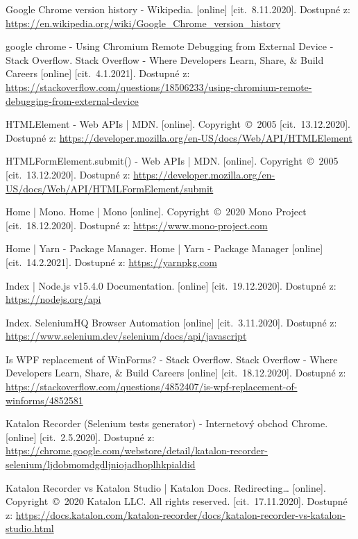 \begin{thebibliography}{99}
 Google Chrome version history - Wikipedia. [online] [cit.~8.11.2020]. Dostupné z: \url{https://en.wikipedia.org/wiki/Google_Chrome_version_history}

 google chrome - Using Chromium Remote Debugging from External Device - Stack Overflow. Stack Overflow - Where Developers Learn, Share, \& Build Careers [online] [cit.~4.1.2021]. Dostupné z: \url{https://stackoverflow.com/questions/18506233/using-chromium-remote-debugging-from-external-device}

 HTMLElement - Web APIs | MDN. [online]. Copyright~©~2005 [cit.~13.12.2020]. Dostupné z: \url{https://developer.mozilla.org/en-US/docs/Web/API/HTMLElement}

 HTMLFormElement.submit() - Web APIs | MDN. [online]. Copyright~©~2005 [cit.~13.12.2020]. Dostupné z: \url{https://developer.mozilla.org/en-US/docs/Web/API/HTMLFormElement/submit}

 Home | Mono. Home | Mono [online]. Copyright~©~2020 Mono Project [cit.~18.12.2020]. Dostupné z: \url{https://www.mono-project.com}

 Home | Yarn - Package Manager. Home | Yarn - Package Manager [online] [cit.~14.2.2021]. Dostupné z: \url{https://yarnpkg.com}

 Index | Node.js v15.4.0 Documentation. [online] [cit.~19.12.2020]. Dostupné z: \url{https://nodejs.org/api}

 Index. SeleniumHQ Browser Automation [online] [cit.~3.11.2020]. Dostupné z: \url{https://www.selenium.dev/selenium/docs/api/javascript}

 Is WPF replacement of WinForms? - Stack Overflow. Stack Overflow - Where Developers Learn, Share, \& Build Careers [online] [cit.~18.12.2020]. Dostupné z: \url{https://stackoverflow.com/questions/4852407/is-wpf-replacement-of-winforms/4852581}

 Katalon Recorder (Selenium tests generator) - Internetový obchod Chrome. [online] [cit.~2.5.2020]. Dostupné z: \url{https://chrome.google.com/webstore/detail/katalon-recorder-selenium/ljdobmomdgdljniojadhoplhkpialdid}

 Katalon Recorder vs Katalon Studio | Katalon Docs. Redirecting… [online]. Copyright~©~2020 Katalon LLC. All rights reserved. [cit.~17.11.2020]. Dostupné z: \url{https://docs.katalon.com/katalon-recorder/docs/katalon-recorder-vs-katalon-studio.html}


\end{thebibliography}

